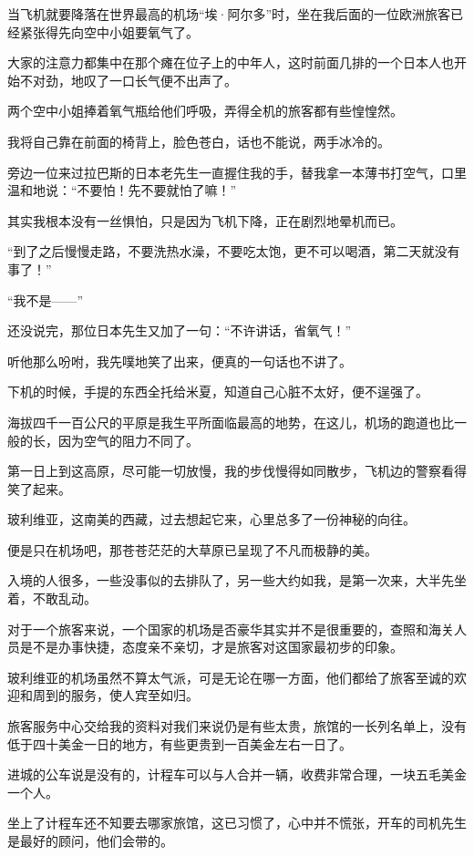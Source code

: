 \par 当飞机就要降落在世界最高的机场“埃·阿尔多”时，坐在我后面的一位欧洲旅客已经紧张得先向空中小姐要氧气了。
\par 大家的注意力都集中在那个瘫在位子上的中年人，这时前面几排的一个日本人也开始不对劲，地叹了一口长气便不出声了。
\par 两个空中小姐捧着氧气瓶给他们呼吸，弄得全机的旅客都有些惶惶然。
\par 我将自己靠在前面的椅背上，脸色苍白，话也不能说，两手冰冷的。
\par 旁边一位来过拉巴斯的日本老先生一直握住我的手，替我拿一本薄书打空气，口里温和地说：“不要怕！先不要就怕了嘛！”
\par 其实我根本没有一丝惧怕，只是因为飞机下降，正在剧烈地晕机而已。
\par “到了之后慢慢走路，不要洗热水澡，不要吃太饱，更不可以喝酒，第二天就没有事了！”
\par “我不是——”
\par 还没说完，那位日本先生又加了一句：“不许讲话，省氧气！”
\par 听他那么吩咐，我先噗地笑了出来，便真的一句话也不讲了。
\par 下机的时候，手提的东西全托给米夏，知道自己心脏不太好，便不逞强了。
\par 海拔四千一百公尺的平原是我生平所面临最高的地势，在这儿，机场的跑道也比一般的长，因为空气的阻力不同了。
\par 第一日上到这高原，尽可能一切放慢，我的步伐慢得如同散步，飞机边的警察看得笑了起来。
\par 玻利维亚，这南美的西藏，过去想起它来，心里总多了一份神秘的向往。
\par 便是只在机场吧，那苍苍茫茫的大草原已呈现了不凡而极静的美。
\par 入境的人很多，一些没事似的去排队了，另一些大约如我，是第一次来，大半先坐着，不敢乱动。
\par 对于一个旅客来说，一个国家的机场是否豪华其实并不是很重要的，查照和海关人员是不是办事快捷，态度亲不亲切，才是旅客对这国家最初步的印象。
\par 玻利维亚的机场虽然不算太气派，可是无论在哪一方面，他们都给了旅客至诚的欢迎和周到的服务，使人宾至如归。
\par 旅客服务中心交给我的资料对我们来说仍是有些太贵，旅馆的一长列名单上，没有低于四十美金一日的地方，有些更贵到一百美金左右一日了。
\par 进城的公车说是没有的，计程车可以与人合并一辆，收费非常合理，一块五毛美金一个人。
\par 坐上了计程车还不知要去哪家旅馆，这已习惯了，心中并不慌张，开车的司机先生是最好的顾问，他们会带的。

